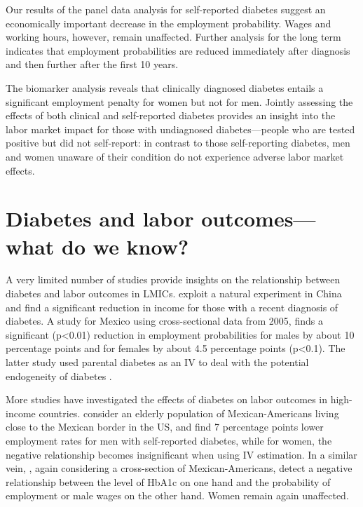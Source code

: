 \documentclass[12pt,english]{article}
\begin{document}
Our results of the panel data analysis for self-reported diabetes suggest an economically important decrease in the employment probability. Wages and working hours, however, remain unaffected. Further analysis for the long term indicates that employment probabilities are reduced immediately after diagnosis and then further after the first 10 years.

The biomarker analysis reveals that clinically diagnosed diabetes entails a significant employment penalty for women but not for men. Jointly assessing the effects of both clinical and self-reported diabetes provides an insight into the labor market impact for those with undiagnosed diabetes---people who are tested positive but did not self-report: in contrast to those self-reporting diabetes, men and women unaware of their condition do not experience adverse labor market effects.	 


\section{\label{sec:labor  outcomes and diabetes literature}Diabetes and labor outcomes---what do we know?}

A very limited number of studies provide insights on the relationship between diabetes and labor outcomes in \acp{LMIC}. \textcite{Liu2014} exploit a natural experiment in China and find a significant reduction in income for those with a recent diagnosis of diabetes. A study for Mexico using cross-sectional data from 2005, finds a significant (p<0.01) reduction in employment probabilities for males by about 10 percentage points and for females by about 4.5 percentage points (p<0.1). The latter study used parental diabetes as an \ac{IV} to deal with the potential endogeneity of diabetes \parencite{Seuring2015}.

More studies have investigated the effects of diabetes on labor outcomes in high-income countries. \textcite{Brown2005} consider an elderly population of Mexican-Americans living close to the Mexican border in the US, and find 7 percentage points lower employment rates for men with self-reported diabetes, while for women, the negative relationship becomes insignificant when using \ac{IV} estimation.  In a similar vein, \textcite{BrownIII2011}, again considering a cross-section of Mexican-Americans, detect a negative  relationship between the level of \ac{HbA1c} on one hand and the probability of employment or male wages on the other hand. Women remain again unaffected.  
\end{document}

